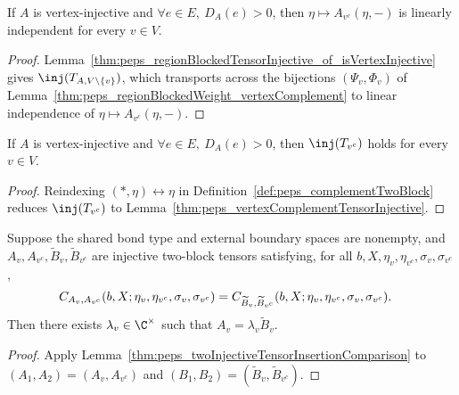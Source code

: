 \begin{lemma}%
    \label{thm:peps_vertexComplementTensorInjective}
    \leanok
    If $A$ is vertex-injective and $\forall e\in E,\ D_A(e)>0$, then
    $\eta\mapsto A_{v^c}(\eta,-)$ is linearly independent for every $v\in V$.
\end{lemma}
\begin{proof}\leanok
    Lemma~\ref{thm:peps_regionBlockedTensorInjective_of_isVertexInjective}
    gives $\inj(T_{A,V\setminus\{v\}})$, which transports across the bijections
    $(\Psi_v,\Phi_v)$ of Lemma~\ref{thm:peps_regionBlockedWeight_vertexComplement}
    to linear independence of $\eta\mapsto A_{v^c}(\eta,-)$.
\end{proof}

\begin{lemma}%
    \label{thm:peps_isTwoBlockInjective_complementTwoBlock}
    \leanok
    If $A$ is vertex-injective and $\forall e\in E,\ D_A(e)>0$, then
    $\inj(T_{v^c})$ holds for every $v\in V$.
\end{lemma}
\begin{proof}\leanok
    Reindexing $(*,\eta)\leftrightarrow\eta$ in
    Definition~\ref{def:peps_complementTwoBlock} reduces $\inj(T_{v^c})$ to
    Lemma~\ref{thm:peps_vertexComplementTensorInjective}.
\end{proof}

\begin{lemma}%
    \label{thm:peps_oneVertexComplementComparison}
    \leanok
    Suppose the shared bond type and external boundary spaces are nonempty, and
    $A_v,A_{v^c},\widetilde B_v,\widetilde B_{v^c}$ are injective two-block
    tensors satisfying, for all $b,X,\eta_v,\eta_{v^c},\sigma_v,\sigma_{v^c}$,
    \begin{align}
        C_{A_v,A_{v^c}}(b,X;\eta_v,\eta_{v^c},\sigma_v,\sigma_{v^c})
         & =
        C_{\widetilde B_v,\widetilde B_{v^c}}
        (b,X;\eta_v,\eta_{v^c},\sigma_v,\sigma_{v^c}).
        \notag
    \end{align}
    Then there exists $\lambda_v\in\C^\times$ such that
    $A_v=\lambda_v\widetilde B_v$.
\end{lemma}
\begin{proof}\leanok
    Apply Lemma~\ref{thm:peps_twoInjectiveTensorInsertionComparison} to
    $(A_1,A_2)=(A_v,A_{v^c})$ and $(B_1,B_2)=(\widetilde B_v,\widetilde B_{v^c})$.
\end{proof}

